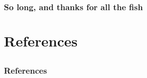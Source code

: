 \documentclass{presentation}
\begin{document}
\appendix
\begin{frame}[plain]
  \frametitle{So long, and thanks for all the fish}
\end{frame}

\section{References}
\subsection{}
\begin{frame}[t, allowframebreaks]
  \frametitle{References}

  \printbibliography[heading = none]
\end{frame}
\end{document}
